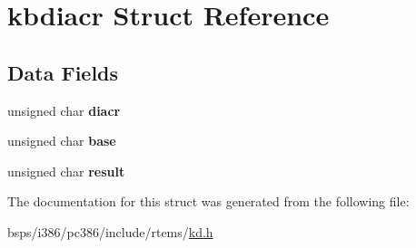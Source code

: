 \hypertarget{structkbdiacr}{}\section{kbdiacr Struct Reference}
\label{structkbdiacr}
\subsection*{Data Fields}
\begin{DoxyCompactItemize}
\item 
\mbox{\label{structkbdiacr_ad23239d99ab9e16e9090f8a720f4b3d5}} 
unsigned char {\bfseries diacr}
\item 
\mbox{\label{structkbdiacr_afadeb43562c979298a5adb5836af1272}} 
unsigned char {\bfseries base}
\item 
\mbox{\label{structkbdiacr_a634fda34aa471789b56f2b21822fabc9}} 
unsigned char {\bfseries result}
\end{DoxyCompactItemize}


The documentation for this struct was generated from the following file\+:\begin{DoxyCompactItemize}
\item 
bsps/i386/pc386/include/rtems/\mbox{\hyperlink{kd_8h}{kd.\+h}}\end{DoxyCompactItemize}
